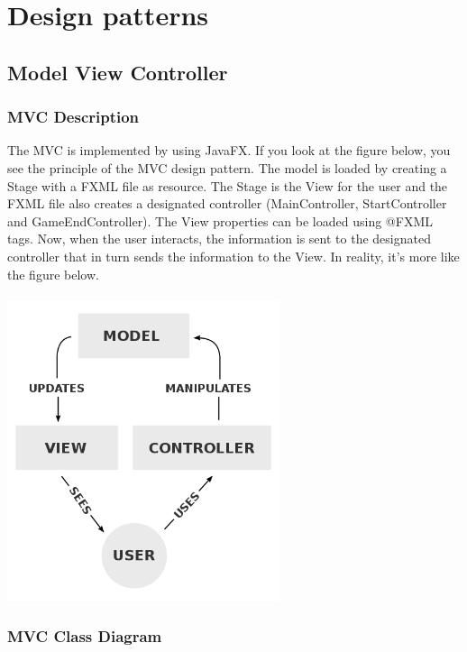 \chapter{Design patterns}

\section{Model View Controller}

\subsection{MVC Description}
The MVC is implemented by using JavaFX. If you look at the figure below, you see the principle of the MVC design pattern. The model is loaded by creating a Stage with a FXML file as resource. The Stage is the View for the user and the FXML file also creates a designated controller (MainController, StartController and GameEndController). The View properties can be loaded using @FXML tags. Now, when the user interacts, the information is sent to the designated controller that in turn sends the information to the View. In reality, it's more like the figure below.
\\\\
\includegraphics[width=80mm]{MVC.png}

\subsection{MVC Class Diagram}

